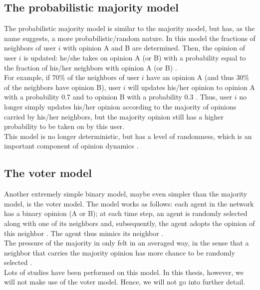 \documentclass[11 pt , letterpaper , twoside , openright]{book}
\begin{document}
\subsection{The probabilistic majority model}

The probabilistic majority model is similar to the majority model, but has, as the name suggests, a more probabilistic/random nature. In this model the fractions of neighbors of user $i$ with opinion A and B are determined. Then, the opinion of user $i$ is updated: he/she takes on opinion A (or B) with a probability equal to the fraction of his/her neighbors with opinion A (or B) \cite{Perra2019}.\\
For example, if $70\%$ of the neighbors of user $i$ have an opinion A (and thus $30 \%$ of the neighbors have opinion B), user $i$ will updates his/her opinion to opinion A with a probability 0.7 and to opinion B with a probability 0.3 \cite{Perra2019}. Thus, user $i$ no longer simply updates his/her opinion according to the majority of opinions carried by his/her neighbors, but the majority opinion still has a higher probability to be taken on by this user.\\
This model is no longer deterministic, but has a level of randomness, which is an important component of opinion dynamics \cite{Perra2019}. 

\subsection{The voter model}

Another extremely simple binary model, maybe even simpler than the majority model, is the voter model. The model works as follows: each agent in the network has a binary opinion (A or B); at each time step, an agent is randomly selected along with one of its neighbors and, subsequently, the agent adopts the opinion of this neighbor \cite{Castellano2009}. The agent thus mimics its neighbor \cite{Castellano2009}. \\
The pressure of the majority in only felt in an averaged way, in the sense that a neighbor that carries the majority opinion has more chance to be randomly selected \cite{Castellano2009}.\\
Lots of studies have been performed on this model. In this thesis, however, we will not make use of the voter model. Hence, we will not go into further detail. %
\end{document}
